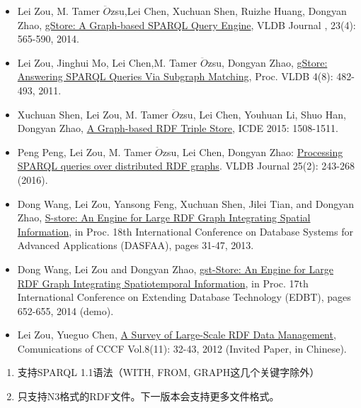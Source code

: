 \documentclass[titlepage, a4paper, 12pt]{article}
\makeatletter
\newcommand{\xiaosihao}{\fontsize{12pt}{\baselineskip}\selectfont}
\renewcommand\subsection{\@startsection{subsection}{1}{\z@}%
{-1.25ex \@plus -.5ex \@minus -.2ex}%
{.4ex \@plus .1ex}%
{\normalfont\xiaosihao\CJKfamily{hei}}}
\makeatother
\begin{document}
\begin{itemize}
	\item
	Lei Zou, M. Tamer $\ddot{O}$zsu,Lei Chen, Xuchuan Shen, Ruizhe Huang, Dongyan Zhao, \href{http://www.icst.pku.edu.cn/intro/leizou/projects/papers/gStoreVLDBJ.pdf}{gStore: A Graph-based SPARQL Query Engine}, VLDB Journal , 23(4): 565-590, 2014.
	\item
	Lei Zou, Jinghui Mo, Lei Chen,M. Tamer $\ddot{O}$zsu, Dongyan Zhao, \href{http://www.icst.pku.edu.cn/intro/leizou/projects/papers/p482-zou.pdf}{gStore: Answering SPARQL Queries Via Subgraph Matching}, Proc. VLDB 4(8): 482-493, 2011.
	\item
	Xuchuan Shen, Lei Zou, M. Tamer $\ddot{O}$zsu, Lei Chen, Youhuan Li, Shuo Han, Dongyan Zhao, \href{http://www.icst.pku.edu.cn/intro/leizou/projects/papers/demo.pdf}{A Graph-based RDF Triple Store}, ICDE 2015: 1508-1511.
	\item
	Peng Peng, Lei Zou, M. Tamer $\ddot{O}$zsu, Lei Chen, Dongyan Zhao: \href{http://arxiv.org/pdf/1411.6763v4.pdf}{Processing SPARQL queries over distributed RDF graphs}. VLDB Journal 25(2): 243-268 (2016).
	\item
	Dong Wang, Lei Zou, Yansong Feng, Xuchuan Shen, Jilei Tian, and Dongyan Zhao,   \href{http://www.icst.pku.edu.cn/intro/leizou/projects/papers/Store.pdf}{S-store: An Engine for Large RDF Graph Integrating Spatial Information}, in Proc. 18th International Conference on Database Systems for Advanced   Applications (DASFAA), pages 31-47, 2013.
	\item
	Dong Wang, Lei Zou and Dongyan Zhao,   \href{http://www.icst.pku.edu.cn/intro/leizou/projects/papers/edbtdemo2014.pdf}{gst-Store: An Engine for Large RDF Graph Integrating Spatiotemporal Information}, in Proc. 17th International Conference on Extending Database
	Technology (EDBT), pages 652-655, 2014 (demo).
	\item
	Lei Zou, Yueguo Chen, \href{http://www.icst.pku.edu.cn/intro/leizou/documentation/pdf/2012CCCF.pdf}{A Survey of Large-Scale RDF Data Management}, Comunications of CCCF Vol.8(11): 32-43, 2012 (Invited Paper, in Chinese).
\end{itemize}

\clearpage

\hyperdef{}{chapter09}{\subsection{第09章：限制}\label{chapter09}}

\begin{enumerate}
	\item
	支持SPARQL 1.1语法（WITH, FROM, GRAPH这几个关键字除外）
	\item
	只支持N3格式的RDF文件。下一版本会支持更多文件格式。
\end{enumerate}
\end{document}
